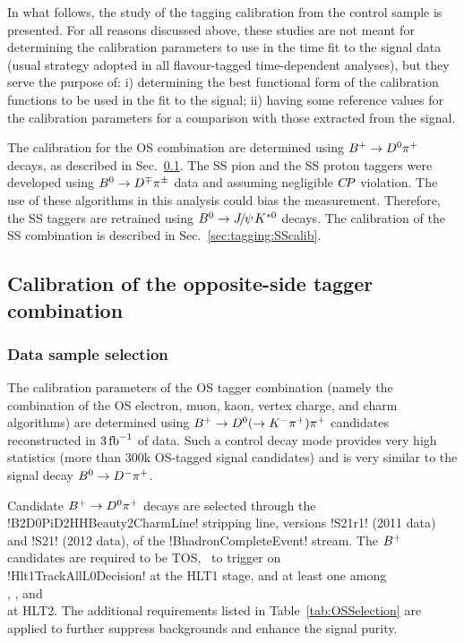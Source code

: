In what follows, the study of the tagging calibration from the control sample is presented.
For all reasons discussed above, these studies are not meant for determining the calibration parameters to use in
the time fit to the signal data (usual strategy adopted in all flavour-tagged time-dependent analyses), but they
serve the purpose of: i) determining the best functional form of the calibration functions to be used in the fit to
the signal; ii) having some reference values for the calibration parameters for a comparison with those extracted
from the signal.

The calibration for the OS combination are determined using $B^+\rightarrow D^0\pi^+$ decays, as
described in Sec.~\ref{sec:tagging:OScalib}. The SS pion and the SS proton taggers were developed
using $B^0\rightarrow D^\mp\pi^\pm$ data and assuming negligible $C\!P$ violation.
The use of these algorithms in this analysis could bias the measurement.
Therefore, the SS taggers are retrained using $\Bz\to\jpsi\Kstarz$ decays. The calibration of the SS
combination is described in Sec.~\ref{sec:tagging:SScalib}.

\subsection{Calibration of the opposite-side tagger combination}
\label{sec:tagging:OScalib}

\subsubsection{Data sample selection}
\label{sec:tagging:OScalib:selection}

The calibration parameters of the OS tagger combination (namely the combination of
the OS electron, muon, kaon, vertex charge, and charm algorithms) are determined using $B^+\rightarrow
D^0(\rightarrow K^-\pi^+)\pi^+$ candidates reconstructed in $3\mbox{\,fb}^{-1}$ of data.
Such a control decay mode provides very high statistics (more than 300k OS-tagged signal candidates) and
is very similar to the signal decay $B^0\rightarrow D^-\pi^+$.

Candidate $B^+\rightarrow D^0\pi^+$ decays are selected through the \spverb!B2D0PiD2HHBeauty2CharmLine! stripping line,
versions \spverb!S21r1! (2011 data) and \spverb!S21! (2012 data), of the \spverb!BhadronCompleteEvent! stream.
The $B^+$ candidates are required to be TOS, \ie~to trigger on \\
\spverb!Hlt1TrackAllL0Decision! at the HLT1 stage,
and at least one among \\
,
, and \\
 at HLT2.
The additional requirements listed in Table~\ref{tab:OSSelection} are applied to further
suppress backgrounds and enhance the signal purity.

